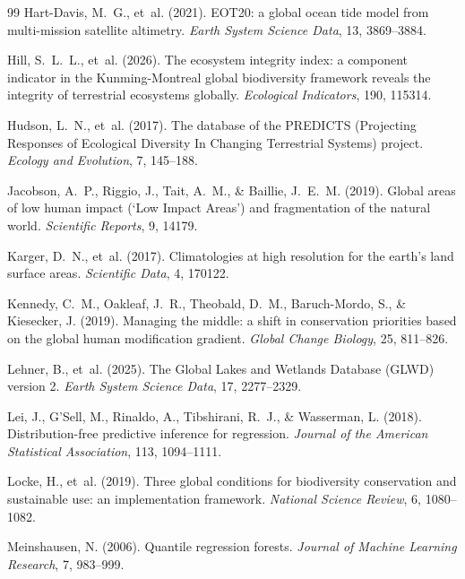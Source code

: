 \documentclass[11pt,a4paper]{article}
\begin{document}
\begin{thebibliography}{99}
Hart-Davis, M.~G., et~al. (2021). EOT20: a global ocean tide model from multi-mission satellite
altimetry. \emph{Earth System Science Data}, 13, 3869--3884.

Hill, S.~L.~L., et~al. (2026). The ecosystem integrity index: a component indicator in the
Kunming-Montreal global biodiversity framework reveals the integrity of terrestrial ecosystems
globally. \emph{Ecological Indicators}, 190, 115314.

Hudson, L.~N., et~al. (2017). The database of the PREDICTS (Projecting Responses of Ecological
Diversity In Changing Terrestrial Systems) project. \emph{Ecology and Evolution}, 7, 145--188.

Jacobson, A.~P., Riggio, J., Tait, A.~M., \& Baillie, J.~E.~M. (2019). Global areas of low
human impact (`Low Impact Areas') and fragmentation of the natural world. \emph{Scientific
Reports}, 9, 14179.

Karger, D.~N., et~al. (2017). Climatologies at high resolution for the earth's land surface
areas. \emph{Scientific Data}, 4, 170122.

Kennedy, C.~M., Oakleaf, J.~R., Theobald, D.~M., Baruch-Mordo, S., \& Kiesecker, J. (2019).
Managing the middle: a shift in conservation priorities based on the global human modification
gradient. \emph{Global Change Biology}, 25, 811--826.

Lehner, B., et~al. (2025). The Global Lakes and Wetlands Database (GLWD) version 2. \emph{Earth
System Science Data}, 17, 2277--2329.

Lei, J., G'Sell, M., Rinaldo, A., Tibshirani, R.~J., \& Wasserman, L. (2018). Distribution-free
predictive inference for regression. \emph{Journal of the American Statistical Association},
113, 1094--1111.

Locke, H., et~al. (2019). Three global conditions for biodiversity conservation and sustainable
use: an implementation framework. \emph{National Science Review}, 6, 1080--1082.

Meinshausen, N. (2006). Quantile regression forests. \emph{Journal of Machine Learning
Research}, 7, 983--999.


\end{thebibliography}
\end{document}
